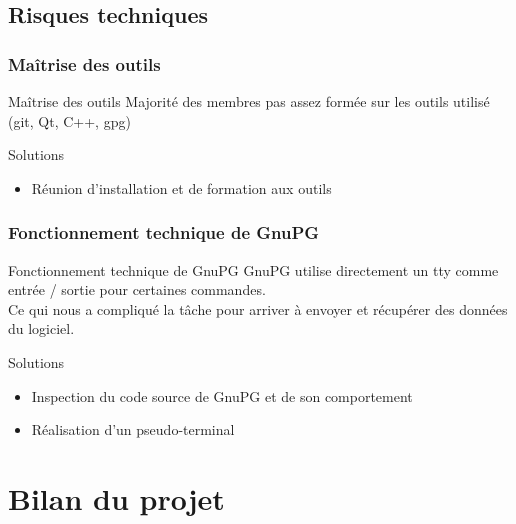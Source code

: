   \subsection{Risques techniques}
    \begin{frame}
      \frametitle{\color{white}Maîtrise des outils}
      \begin{block}{Maîtrise des outils}
        Majorité des membres pas assez formée sur les outils utilisé\\
        (git, Qt, C++, gpg)
      \end{block}
      \pause
      \begin{exampleblock}{Solutions}
        \begin{itemize}
          \item Réunion d'installation et de formation aux outils
        \end{itemize}
      \end{exampleblock}
    \end{frame}
    \begin{frame}
      \frametitle{\color{white}Fonctionnement technique de GnuPG}
      \begin{block}{Fonctionnement technique de GnuPG}
        GnuPG utilise directement un tty comme entrée / sortie pour certaines commandes.\\
        Ce qui nous a compliqué la tâche pour arriver à envoyer
        et récupérer des données du logiciel.
      \end{block}
      \pause
      \begin{exampleblock}{Solutions}
        \begin{itemize}
          \item Inspection du code source de GnuPG et de son comportement
          \item Réalisation d'un pseudo-terminal
        \end{itemize}
      \end{exampleblock}
    \end{frame}

\section{Bilan du projet}
  
